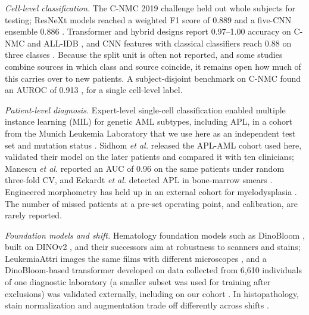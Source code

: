 \documentclass[journal]{IEEEtran}
\begin{document}
\emph{Cell-level classification.} The C-NMC 2019 challenge \cite{gupta2022cnmc} held out whole subjects for testing; ResNeXt models reached a weighted F1 score of 0.889 \cite{prellberg2019cnmc} and a five-CNN ensemble 0.886 \cite{mondal2021ensemble}. Transformer and hybrid designs report 0.97--1.00 accuracy on C-NMC and ALL-IDB \cite{labati2011allidb,jammal2025causalformer,jammal2025neurobridge}, and CNN features with classical classifiers reach 0.88 on three classes \cite{kasim2025multiclass}. Because the split unit is often not reported, and some studies combine sources in which class and source coincide, it remains open how much of this carries over to new patients. A subject-disjoint benchmark on C-NMC found an AUROC of 0.913 \cite{albzour2026leakage}, for a single cell-level label.

\emph{Patient-level diagnosis.} Expert-level single-cell classification \cite{matek2019blast,matek2021bmc} enabled multiple instance learning (MIL) for genetic AML subtypes, including APL, in a cohort from the Munich Leukemia Laboratory \cite{hehr2023scemila} that we use here as an independent test set and mutation status \cite{wei2025annotationfree,eckardt2022npm1}. Sidhom \emph{et al.} \cite{sidhom2021apl} released the APL-AML cohort used here, validated their model on the later patients and compared it with ten clinicians; Manescu \emph{et al.} \cite{manescu2023apl} reported an AUC of 0.96 on the same patients under random three-fold CV, and Eckardt \emph{et al.} detected APL in bone-marrow smears \cite{eckardt2022apl}. Engineered morphometry has held up in an external cohort for myelodysplasia \cite{dealmeida2023haemorasis}. The number of missed patients at a pre-set operating point, and calibration, are rarely reported.

\emph{Foundation models and shift.} Hematology foundation models such as DinoBloom \cite{koch2024dinobloom}, built on DINOv2 \cite{oquab2024dinov2}, and their successors \cite{muminov2025cytodino,zamora2026retrieval} aim at robustness to scanners and stains; LeukemiaAttri images the same films with different microscopes \cite{rehman2024leukemiaattri}, and a DinoBloom-based transformer developed on data collected from 6,610 individuals of one diagnostic laboratory (a smaller subset was used for training after exclusions) was validated externally, including on our cohort \cite{dasdelen2026caitomorph}. In histopathology, stain normalization and augmentation trade off differently across shifts \cite{tellez2019stain}.
\end{document}
